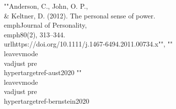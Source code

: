 {{{{{{{{{{{{{{{{{{{{{{{{{{{{""Anderson, C., John, O. P., \\& Keltner, D. (2012). The personal sense of power. \\emph{Journal of Personality}, \\emph{80}(2), 313--344. \\url{https://doi.org/10.1111/j.1467-6494.2011.00734.x}"", ""\\leavevmode\\vadjust pre{\\hypertarget{ref-aust2020}{}}%
""\\leavevmode\\vadjust pre{\\hypertarget{ref-bernstein2020}{}}%
}}}}}}}}}}}}}}}}}}}}}}}}}}}}
